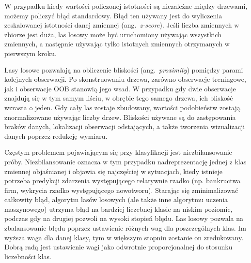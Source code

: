 \documentclass[12pt,a4paper,twoside,openany]{book}
\begin{document}
W przypadku kiedy wartości policzonej istotności są niezależne między drzewami, możemy policzyć błąd standardowy. Błąd ten używany jest do wyliczenia zeskalowanej istotności danej zmiennej (ang.~\textit{z-score}). Jeśli liczba zmiennych w zbiorze jest duża, las losowy może być uruchomiony używając wszystkich zmiennych, a następnie używając tylko istotnych zmiennych otrzymanych w pierwszym kroku.

Lasy losowe pozwalają na obliczenie bliskości (ang.~\textit{proximity}) pomiędzy parami kolejnych obserwacji. Po skonstruowaniu drzewa, zarówno obserwacje treningowe, jak i obserwacje OOB stanowią jego wsad. W przypadku gdy dwie obserwacje znajdują się w tym samym liściu, w obrębie tego samego drzewa, ich bliskość wzrasta o jeden. Gdy cały las zostaje zbudowany, wartości podobieństw zostają znormalizowane używając liczby drzew. Bliskości używane są do zastępowania braków danych, lokalizacji obserwacji odstających, a także tworzenia wizualizacji danych poprzez redukcję wymiaru.

Częstym problemem pojawiającym się przy klasyfikacji jest niezbilansowanie próby. Niezbilansowanie oznacza w tym przypadku nadreprezentację jednej z klas zmiennej objaśnianej i objawia się najczęściej w sytuacjach, kiedy istnieje potrzeba predykcji zdarzenia występującego relatywnie rzadko (np. bankructwa firm, wykrycia rzadko występującego nowotworu). Starając się zminimalizować całkowity błąd, algorytm lasów losowych (ale także inne algorytmu uczenia maszynowego) utrzyma błąd na bardziej liczebnej klasie na niskim poziomie, podczas gdy na drugiej pozwoli na wysoki stopień błędu. Las losowy pozwala na zbalansowanie błędu poprzez ustawienie różnych wag dla poszczególnych klas. Im wyższa waga dla danej klasy, tym w większym stopniu zostanie on zredukowany. Dobrą radą jest ustawienie wagi jako odwrotnie proporcjonalnej do stosunku liczebności klas. 
\end{document}
